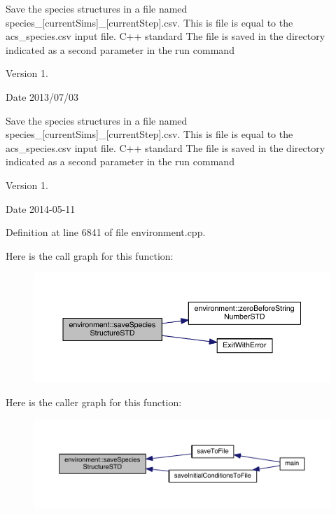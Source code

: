 Save the species structures in a file named species\+\_\+\mbox{[}current\+Sims\mbox{]}\+\_\+\mbox{[}current\+Step\mbox{]}.csv. This is file is equal to the acs\+\_\+species.\+csv input file. C++ standard The file is saved in the directory indicated as a second parameter in the run command \begin{DoxyVersion}{Version}
1. 
\end{DoxyVersion}
\begin{DoxyDate}{Date}
2013/07/03
\end{DoxyDate}
Save the species structures in a file named species\+\_\+\mbox{[}current\+Sims\mbox{]}\+\_\+\mbox{[}current\+Step\mbox{]}.csv. This is file is equal to the acs\+\_\+species.\+csv input file. C++ standard The file is saved in the directory indicated as a second parameter in the run command \begin{DoxyVersion}{Version}
1. 
\end{DoxyVersion}
\begin{DoxyDate}{Date}
2014-\/05-\/11 
\end{DoxyDate}


Definition at line 6841 of file environment.\+cpp.



Here is the call graph for this function\+:\nopagebreak
\begin{figure}[H]
\begin{center}
\leavevmode
\includegraphics[width=350pt]{a00013_a9daeb4f255100b8ad59de9ea80b19b5b_cgraph}
\end{center}
\end{figure}




Here is the caller graph for this function\+:\nopagebreak
\begin{figure}[H]
\begin{center}
\leavevmode
\includegraphics[width=350pt]{a00013_a9daeb4f255100b8ad59de9ea80b19b5b_icgraph}
\end{center}
\end{figure}


